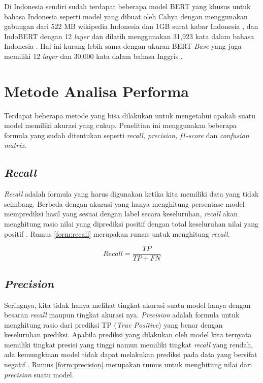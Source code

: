 Di Indonesia sendiri sudah terdapat beberapa model BERT yang khusus untuk bahasa Indonesia seperti model yang dibuat oleh Cahya dengan menggunakan gabungan dari 522 MB wikipedia Indonesia dan 1GB surat kabar Indonesia \cite{cahya_bert}, dan IndoBERT dengan 12 \textit{layer} dan dilatih menggunakan 31,923 kata dalam bahasa Indonesia \cite{koto2020indolem}. Hal ini kurang lebih sama dengan ukuran BERT-\textit{Base} yang juga memiliki 12 \textit{layer} dan 30,000 kata dalam bahasa Inggris \cite{devlin2019bert}.

\section{Metode Analisa Performa}
Terdapat beberapa metode yang bisa dilakukan untuk mengetahui apakah suatu model memiliki akurasi yang cukup. Penelitian ini menggunakan beberapa formula yang sudah ditentukan seperti \textit{recall, precision, f1-score} dan \textit{confusion matrix}.

\subsection{\textit{Recall}}

\textit{Recall} adalah formula yang harus digunakan ketika kita memiliki data yang tidak seimbang. Berbeda dengan akurasi yang hanya menghitung persentase model memprediksi hasil yang sesuai dengan label secara keseluruhan, \textit{recall} akan menghitung rasio nilai yang diprediksi positif dengan total keseluruhan nilai yang positif \cite{metrics_ml}. Rumus \ref{form:recall} merupakan rumus untuk menghitung \textit{recall}.

\begin{equation}
    Recall = \frac{TP}{TP+FN}
    \label{form:recall}
\end{equation}

\subsection{\textit{Precision}}

Seringnya, kita tidak hanya melihat tingkat akurasi suatu model hanya dengan besaran \textit{recall} maupun tingkat akurasi nya. \textit{Precision} adalah formula untuk menghitung rasio dari prediksi TP (\textit{True Positive}) yang benar dengan keseluruhan prediksi. Apabila prediksi yang dilakukan oleh model kita ternyata memiliki tingkat presisi yang tinggi namun memiliki tingkat \textit{recall} yang rendah, ada kemungkinan model tidak dapat melakukan prediksi pada data yang bersifat negatif \cite{metrics_ml}. Rumus \ref{form:precision} merupakan rumus untuk menghitung nilai dari \textit{precision} suatu model.

